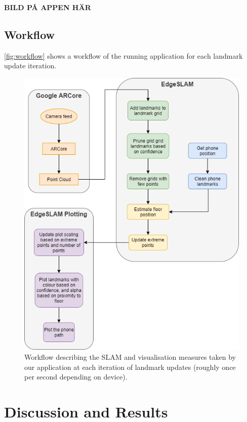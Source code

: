 \documentclass{article}
\begin{document}
\textbf{BILD PÅ APPEN HÄR}

\subsection{Workflow} \label{workflow}
\autoref{fig:workflow} shows a workflow of the running application for each landmark update iteration.
\begin{figure}[!htb]
    \centering
    \includegraphics[width=0.9\linewidth]{EdgeSLAM Workflow Diagran.png}
    \caption{Workflow describing the SLAM and visualisation measures taken by our application at each iteration of landmark updates (roughly once per second depending on device).}
    \label{fig:workflow}
\end{figure}

\section{Discussion and Results}
\end{document}

